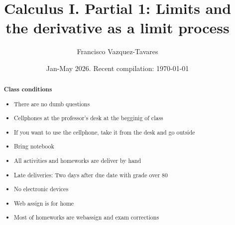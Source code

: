 \documentclass[a4paper]{tufte-handout} %
\title{Calculus I. Partial 1: Limits and the derivative as a limit process}
\author{Francisco Vazquez-Tavares}
\date{Jan-May 2026. Recent compilation: \today} %
\begin{document}
\maketitle %


\begin{abstract}
	\textbf{Class conditions}
    \begin{itemize}
        \item There are no dumb questions
        \item Cellphones at the professor's desk at the begginig of class 
        \item If you want to use the cellphone, take it from the desk and go outside
        \item Bring notebook
        \item All activities and homeworks are deliver by hand
        \item Late deliveries: Two days after due date with grade over 80
        \item No electronic devices
        \item Web assign is for home
        \item Most of homeworks are webassign and exam corrections
    \end{itemize}



\end{abstract}



%




\nocite{*}


\end{document}

